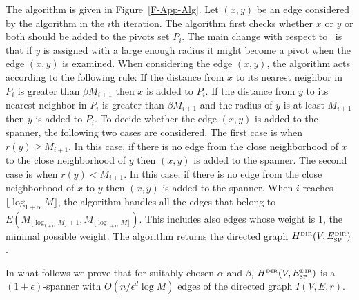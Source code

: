 \documentclass[proceedings]{stacs}
\theoremstyle{plain}\newtheorem{satz}[thm]{Satz}
\theoremstyle{definition}\newtheorem{crucial}[thm]{Crucial Definition}
\def\SP{\mbox{\tiny SP}}
\def\DIR{\mbox{\tiny DIR}}
\begin{document}
The algorithm is given in Figure~\ref{F-App-Alg}. Let $(x,y)$ be
an edge considered by the algorithm in the $i$th iteration. The
algorithm first checks whether $x$ or $y$ or both should be added
to the pivots set $P_i$. The main change with respect
to~\cite{PeRo08} is that if $y$ is assigned with a large enough
radius it might become a pivot when the edge $(x,y)$ is examined.
When considering the edge $(x,y)$, the algorithm acts according to
the following rule: If the distance from $x$ to its nearest
neighbor in $P_i$ is greater than $\beta M_{i+1}$ then $x$ is
added to $P_i$. If the distance from $y$ to its nearest neighbor
in $P_i$ is greater than $\beta M_{i+1}$ and the radius of $y$ is
at least $M_{i+1}$ then $y$ is added to $P_i$. To decide whether
the edge $(x,y)$ is added to the spanner, the following two cases
are considered. The first case is when $r(y) \geq M_{i+1}$. In
this case, if there is no edge from the close neighborhood of $x$
to the close neighborhood of $y$ then $(x,y)$ is added to the
spanner. The second case is when $r(y) < M_{i+1}$. In this case,
if there is no edge from the close neighborhood of $x$ to $y$ then
$(x,y)$ is added to the spanner. When $i$ reaches $\lfloor
\log_{1+\alpha}M\rfloor$, the algorithm handles all the edges that
belong to $E(M_{\lfloor \log_{1+\alpha}M\rfloor+1},M_{\lfloor
\log_{1+\alpha}M\rfloor})$. This includes also edges whose weight
is $1$, the minimal possible weight. The algorithm returns the
directed graph $H^{\DIR}(V,E_{\SP}^{\DIR})$.

In what follows we prove that for suitably chosen $\alpha$ and
$\beta$, $H^{\DIR}(V,E_{\SP}^{\DIR})$ is a $(1+\epsilon)$-spanner
with $O(n/\epsilon^{d}\log M)$ edges of the directed graph
$I(V,E,r)$.
\end{document}
